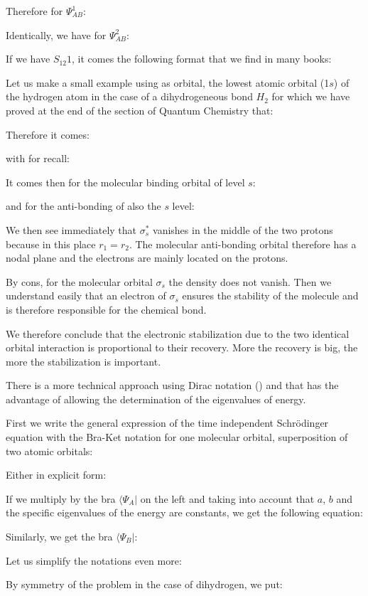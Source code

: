 	Therefore for $\Psi_{AB}^1$:
	
	Identically, we have for $\Psi_{AB}^2$:
	
	If we have $S_{12} 1$, it comes the following format that we find in many books:
	
	Let us make a small example using as orbital, the lowest atomic orbital (1$s$) of the hydrogen atom in the case of a dihydrogeneous bond $H_2$ for which we have proved at the end of the section of Quantum Chemistry that:
	
	Therefore it comes:
	
	with for recall:
	
	It comes then for the molecular binding orbital of level $s$:
	
	and for the anti-bonding of also the $s$ level:
	
	We then see immediately that $\sigma^*_s$ vanishes in the middle of the two protons because in this place $r_1=r_2$. The molecular anti-bonding orbital therefore has a nodal plane and the electrons are mainly located on the protons.
	
	By cons, for the molecular orbital $\sigma_s$ the density does not vanish. Then we understand easily that an electron of $\sigma_s$ ensures the stability of the molecule and is therefore responsible for the chemical bond.
	
	We therefore conclude that the electronic stabilization due to the two identical orbital interaction is proportional to their recovery. More the recovery is big, the more the stabilization is important.
	
	There is a more technical approach using Dirac notation () and that has the advantage of allowing the determination of the eigenvalues of energy.

	First we write the general expression of the time independent Schrödinger equation with the Bra-Ket notation for one molecular orbital, superposition of two atomic orbitals:
	
	Either in explicit form:
	
	If we multiply by the bra $\langle \Psi_A|$  on the left and taking into account that $a$, $b$ and the specific eigenvalues of the energy are constants, we get the following equation:
	
	Similarly, we get the bra $\langle \Psi_B|$:
	
	Let us simplify the notations even more:
	
	By symmetry of the problem in the case of dihydrogen, we put:
	
